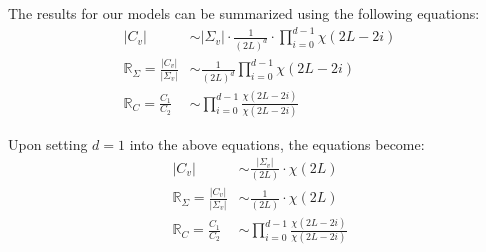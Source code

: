 \documentclass[journal]{IEEEtran}
\begin{document}
The results for our models can be summarized using the following equations:
\begin{align*}
  |C_v| &\sim |\Sigma_v| \cdot \frac{1}{(2L)^d} \cdot \prod_{i=0}^{d-1} \chi (2L-2i) \\ %
  \mathbb{R}_{\Sigma} = \frac{|C_v|}{|\Sigma_v|} &\sim \frac{1}{(2L)^d} \prod^{d-1}_{i=0} \chi(2L-2i) \\ %
\mathbb{R}_{C} = \frac{C_1}{C_2} &\sim \prod_{i=0}^{d-1} \frac{\chi(2L-2i)}{\chi(2L-2i)}
\end{align*}

Upon setting $d=1$ into the above equations,
  the equations become:
\begin{align*}
  |C_v| &\sim  \frac{|\Sigma_v|}{(2L)} \cdot \chi (2L) \\ %
  \mathbb{R}_{\Sigma} = \frac{|C_v|}{|\Sigma_v|} &\sim \frac{1}{(2L)} \cdot \chi(2L) \\ %
\mathbb{R}_{C} = \frac{C_1}{C_2} &\sim \prod_{i=0}^{d-1} \frac{\chi(2L-2i)}{\chi(2L-2i)}
\end{align*}
\end{document}
